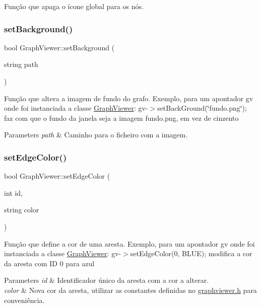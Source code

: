 Função que apaga o ícone global para os nós. \mbox{\label{class_graph_viewer_a02437b5fecd8b90de24436068312d593}} 
\subsubsection{\texorpdfstring{set\+Background()}{setBackground()}}
{\footnotesize\ttfamily bool Graph\+Viewer\+::set\+Background (\begin{DoxyParamCaption}\item[{string}]{path }\end{DoxyParamCaption})}

Função que altera a imagem de fundo do grafo. Exemplo, para um apontador gv onde foi instanciada a classe \hyperlink{class_graph_viewer}{Graph\+Viewer}\+: gv-\/$>$set\+Back\+Ground(\char`\"{}fundo.\+png\char`\"{}); faz com que o fundo da janela seja a imagem fundo.\+png, em vez de cinzento


\begin{DoxyParams}{Parameters}
{\em path} & Caminho para o ficheiro com a imagem. \\
\hline
\end{DoxyParams}
\mbox{\label{class_graph_viewer_a07ccc96707efae4aa5f3ced3dca015af}} 
\subsubsection{\texorpdfstring{set\+Edge\+Color()}{setEdgeColor()}}
{\footnotesize\ttfamily bool Graph\+Viewer\+::set\+Edge\+Color (\begin{DoxyParamCaption}\item[{int}]{id,  }\item[{string}]{color }\end{DoxyParamCaption})}

Função que define a cor de uma aresta. Exemplo, para um apontador gv onde foi instanciada a classe \hyperlink{class_graph_viewer}{Graph\+Viewer}\+: gv-\/$>$set\+Edge\+Color(0, B\+L\+U\+E); modifica a cor da aresta com ID 0 para azul


\begin{DoxyParams}{Parameters}
{\em id} & Identificador único da aresta com a cor a alterar. \\
\hline
{\em color} & Nova cor da aresta, utilizar as constantes definidas no \hyperlink{graphviewer_8h_source}{graphviewer.\+h} para conveniência. \\
\hline
\end{DoxyParams}
\mbox{\label{class_graph_viewer_a1698f1c6b3a8e7cabc7b7d7cf42fc7f0}} 
